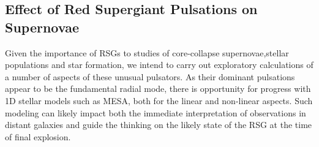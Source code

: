 \subsection{Effect of Red Supergiant Pulsations on Supernovae}

Given the importance of RSGs to studies of core-collapse supernovae,stellar populations and star formation, we intend to carry out
exploratory calculations of a number of aspects of these unusual
pulsators. As their dominant pulsations appear to be the fundamental
radial mode, there is opportunity for progress with 1D stellar models
such as MESA, both for the linear and non-linear aspects. Such
modeling can likely impact both the immediate interpretation of observations in
distant galaxies and guide the thinking on the likely state of the RSG
at the time of final explosion. 